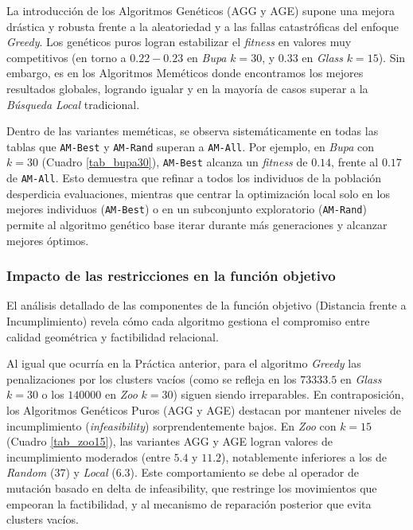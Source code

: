 \documentclass[a4paper,12pt]{article}%
\begin{document}
La introducción de los Algoritmos Genéticos (AGG y AGE) supone una mejora drástica y robusta frente a la aleatoriedad y a las fallas catastróficas del enfoque \textit{Greedy}. Los genéticos puros logran estabilizar el \textit{fitness} en valores muy competitivos (en torno a $0.22-0.23$ en \textit{Bupa} $k=30$, y $0.33$ en \textit{Glass} $k=15$). Sin embargo, es en los Algoritmos Meméticos donde encontramos los mejores resultados globales, logrando igualar y en la mayoría de casos superar a la \textit{Búsqueda Local} tradicional.

Dentro de las variantes meméticas, se observa sistemáticamente en todas las tablas que \texttt{AM-Best} y \texttt{AM-Rand} superan a \texttt{AM-All}. Por ejemplo, en \textit{Bupa} con $k=30$ (Cuadro \ref{tab_bupa30}), \texttt{AM-Best} alcanza un \textit{fitness} de $0.14$, frente al $0.17$ de \texttt{AM-All}. Esto demuestra que refinar a todos los individuos de la población desperdicia evaluaciones, mientras que centrar la optimización local solo en los mejores individuos (\texttt{AM-Best}) o en un subconjunto exploratorio (\texttt{AM-Rand}) permite al algoritmo genético base iterar durante más generaciones y alcanzar mejores óptimos.

\subsubsection{Impacto de las restricciones en la función objetivo}

\noindent El análisis detallado de las componentes de la función objetivo (Distancia frente a Incumplimiento) revela cómo cada algoritmo gestiona el compromiso entre calidad geométrica y factibilidad relacional.

Al igual que ocurría en la Práctica anterior, para el algoritmo \textit{Greedy} las penalizaciones por los clusters vacíos (como se refleja en los $73333.5$ en \textit{Glass} $k=30$ o los $140000$ en \textit{Zoo} $k=30$) siguen siendo irreparables. En contraposición, los Algoritmos Genéticos Puros (AGG y AGE) destacan por mantener niveles de incumplimiento (\textit{infeasibility}) sorprendentemente bajos. En \textit{Zoo} con $k=15$ (Cuadro \ref{tab_zoo15}), las variantes AGG y AGE logran valores de incumplimiento moderados (entre $5.4$ y $11.2$), notablemente inferiores a los de \textit{Random} ($37$) y \textit{Local} ($6.3$). Este  comportamiento se debe al operador de mutación basado en delta de infeasibility, que restringe los movimientos que empeoran la factibilidad, y al mecanismo de reparación posterior que evita clusters vacíos.
\end{document}
